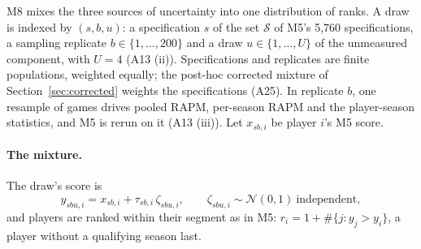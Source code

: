 \documentclass[11pt,a4paper]{article}
\begin{document}
M8 mixes the three sources of uncertainty into one distribution of ranks. A
draw is indexed by $(s, b, u)$: a specification $s$ of the set $\mathcal S$ of
M5's 5,760 specifications, a
sampling replicate $b \in \{1, \dots, 200\}$ and a draw $u \in \{1, \dots, U\}$ of the
unmeasured component, with $U = 4$ (A13 (ii)). Specifications and replicates
are finite populations, weighted equally; the post-hoc corrected mixture of
Section~\ref{sec:corrected} weights the specifications (A25). In replicate $b$, one resample of
games drives pooled RAPM, per-season RAPM and the player-season statistics,
and M5 is rerun on it (A13 (iii)). Let $x_{sb,i}$ be player $i$'s M5 score.

\paragraph{The mixture.}
The draw's score is
\begin{equation}
  y_{sbu,i} = x_{sb,i} + \tau_{sb,i}\, \zeta_{sbu,i},
  \qquad \zeta_{sbu,i} \sim \mathcal N(0, 1)\ \text{independent},
  \label{eq:mixture}
\end{equation}
and players are ranked within their segment as in M5:
$r_i = 1 + \#\{j : y_j > y_i\}$, a player without a qualifying season last.
\end{document}
